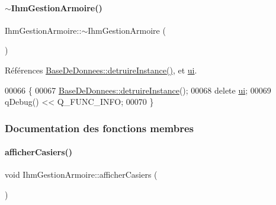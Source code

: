 \mbox{\label{class_ihm_gestion_armoire_a6d854653399972a013f79edfe32b04cb}} 
\paragraph{\texorpdfstring{$\sim$\+Ihm\+Gestion\+Armoire()}{~IhmGestionArmoire()}}
{\footnotesize\ttfamily Ihm\+Gestion\+Armoire\+::$\sim$\+Ihm\+Gestion\+Armoire (\begin{DoxyParamCaption}{ }\end{DoxyParamCaption})}



Références \hyperlink{class_base_de_donnees_a457401c0816b888c77ce915997545f4e}{Base\+De\+Donnees\+::detruire\+Instance()}, et \hyperlink{class_ihm_gestion_armoire_a793a2816dc21b3161566138d2af5a8b9}{ui}.


\begin{DoxyCode}
00066 \{
00067     \hyperlink{class_base_de_donnees_a457401c0816b888c77ce915997545f4e}{BaseDeDonnees::detruireInstance}();
00068     \textcolor{keyword}{delete} \hyperlink{class_ihm_gestion_armoire_a793a2816dc21b3161566138d2af5a8b9}{ui};
00069     qDebug() << Q\_FUNC\_INFO;
00070 \}
\end{DoxyCode}


\subsubsection{Documentation des fonctions membres}
\mbox{\label{class_ihm_gestion_armoire_a04201173bd9ac135227ac56a6c22a999}} 
\paragraph{\texorpdfstring{afficher\+Casiers()}{afficherCasiers()}}
{\footnotesize\ttfamily void Ihm\+Gestion\+Armoire\+::afficher\+Casiers (\begin{DoxyParamCaption}{ }\end{DoxyParamCaption})\hspace{0.3cm}{\ttfamily [private]}}




